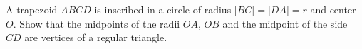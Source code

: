 A trapezoid $ABCD$ is inscribed in a circle of radius $|BC| = |DA| = r$ and center $O$. Show that the midpoints of the radii $OA$, $OB$ and the midpoint of the side $CD$ are vertices of a regular triangle.
